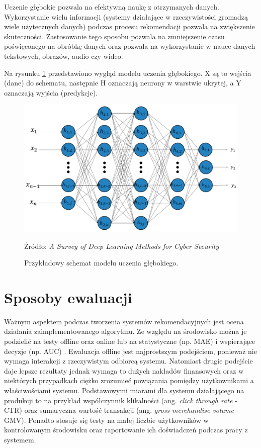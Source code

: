 Uczenie głębokie pozwala na efektywną naukę z otrzymanych danych. Wykorzystanie wielu informacji (systemy działające w rzeczywistości gromadzą wiele użytecznych danych) podczas procesu rekomendacji pozwala na zwiększenie skuteczności. Zastosowanie tego sposobu pozwala na zmniejszenie czasu poświęconego na obróbkę danych oraz pozwala na wykorzystanie w nauce danych tekstowych, obrazów, audio czy wideo.

Na rysunku \ref{fig:deep_learning_schema} przedstawiono wygląd modelu uczenia głębokiego. X są to wejścia (dane) do schematu, następnie H oznaczają neurony w warstwie ukrytej, a Y oznaczają wyjścia (predykcje).

\begin{figure}[H]
    \centering
    \includegraphics[scale=0.5]{images/deep_learning.png}
    \caption{Przykładowy schemat modelu uczenia głębokiego.}
    Źródło: \textit{A Survey of Deep Learning Methods for Cyber Security} \cite{surveyDeepLearning}
    \label{fig:deep_learning_schema}
\end{figure}

\section{Sposoby ewaluacji}\label{metryki}

Ważnym aspektem podczas tworzenia systemów rekomendacyjnych jest ocena działania zaimplementowanego algorytmu. Ze względu na środowisko można je podzielić na testy offline oraz online lub na statystyczne (np. MAE) i wspierające decyzje (np. AUC) \cite{herlocker}. Ewaluacja offline jest najprostszym podejściem, ponieważ nie wymaga interakcji z rzeczywistym odbiorcą systemu. Natomiast drugie podejście daje lepsze rezultaty jednak wymaga to dużych nakładów finansowych oraz w niektórych przypadkach ciężko zrozumieć powiązania pomiędzy użytkownikami a właściwościami systemu. Podstawowymi miarami dla systemu działającego na produkcji to na przykład współczynnik klikalności (ang. \textit{click through rate} - CTR) oraz sumaryczna wartość transakcji (ang. \textit{gross merchandise volume} - GMV). Ponadto stosuje się testy na małej liczbie użytkowników w kontrolowanym środowisku oraz raportowanie ich doświadczeń podczas pracy z systemem.

